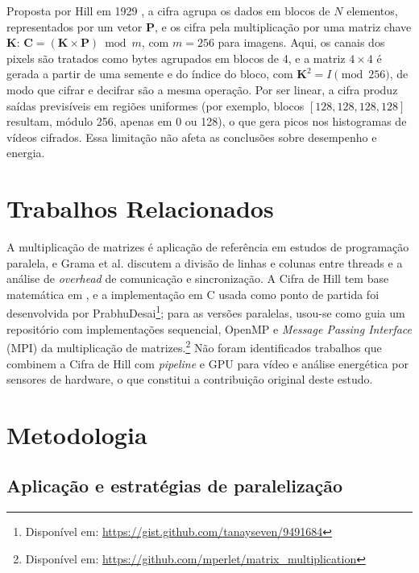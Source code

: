 \documentclass[12pt]{article}
\begin{document}
Proposta por Hill em 1929 \cite{hill1929}, a cifra agrupa os dados em blocos de
$N$ elementos, representados por um vetor $\mathbf{P}$, e os cifra pela
multiplicação por uma matriz chave $\mathbf{K}$:
$\mathbf{C} = (\mathbf{K} \times \mathbf{P}) \bmod m$, com $m = 256$ para
imagens. Aqui, os canais dos pixels são tratados como bytes agrupados em blocos
de 4, e a matriz $4\times4$ é gerada a partir de uma semente e do índice do
bloco, com $\mathbf{K}^2 = I \pmod{256}$, de modo que cifrar e decifrar são a
mesma operação. Por ser linear, a cifra produz saídas previsíveis em regiões
uniformes (por exemplo, blocos $[128,128,128,128]$ resultam, módulo 256, apenas
em 0 ou 128), o que gera picos nos histogramas de vídeos cifrados. Essa
limitação não afeta as conclusões sobre desempenho e energia.


\section{Trabalhos Relacionados}

A multiplicação de matrizes é aplicação de referência em estudos de
programação paralela, e Grama et al. \cite{grama2003} discutem a divisão de
linhas e colunas entre threads e a análise de \textit{overhead} de comunicação e
sincronização. A Cifra de Hill tem base matemática em \cite{hill1929}, e a
implementação em C usada como ponto de partida foi desenvolvida por
PrabhuDesai\footnote{Disponível em: \url{https://gist.github.com/tanayseven/9491684}};
para as versões paralelas, usou-se como guia um repositório com
implementações sequencial, OpenMP e \textit{Message Passing Interface} (MPI)
da multiplicação de
matrizes.\footnote{Disponível em: \url{https://github.com/mperlet/matrix\_multiplication}}
Não foram identificados trabalhos que combinem a Cifra de Hill com
\textit{pipeline} e GPU para vídeo e análise energética por sensores de
hardware, o que constitui a contribuição original deste estudo.


\section{Metodologia}

\subsection{Aplicação e estratégias de paralelização}
\end{document}
